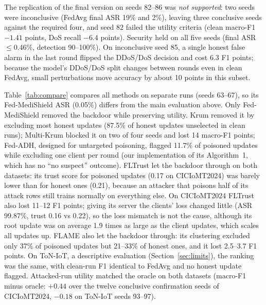 \documentclass[conference]{IEEEtran}
\begin{document}
The replication of the final version on seeds 82--86 was \emph{not supported}: two seeds were inconclusive (FedAvg final ASR 19\% and 2\%), leaving three conclusive seeds against the required four, and seed 82 failed the utility criteria (clean macro-F1 $-1.41$ points, DoS recall $-6.4$ points). Security held on all five seeds (final ASR $\leq$0.46\%, detection 90--100\%). On inconclusive seed 85, a single honest false alarm in the last round flipped the DDoS/DoS decision and cost 6.3 F1 points; because the model's DDoS/DoS split changes between rounds even in clean FedAvg, small perturbations move accuracy by about 10 points in this subset.

Table~\ref{tab:compare} compares all methods on separate runs (seeds 63--67), so its Fed-MediShield ASR (0.05\%) differs from the main evaluation above. Only Fed-MediShield removed the backdoor while preserving utility. Krum removed it by excluding most honest updates (87.5\% of honest updates unselected in clean runs); Multi-Krum blocked it on two of four seeds and lost 14 macro-F1 points; Fed-ADH, designed for untargeted poisoning, flagged 11.7\% of poisoned updates while excluding one client per round (our implementation of its Algorithm~1, which has no ``no suspect'' outcome). FLTrust let the backdoor through on both datasets: its trust score for poisoned updates (0.17 on CICIoMT2024) was barely lower than for honest ones (0.21), because an attacker that poisons half of its attack rows still trains normally on everything else. On CICIoMT2024 FLTrust also lost 11--12 F1 points; giving its server the clients' loss changed little (ASR 99.87\%, trust 0.16 vs 0.22), so the loss mismatch is not the cause, although its root update was on average 1.9 times as large as the client updates, which scales all updates up. FLAME also let the backdoor through: its clustering excluded only 37\% of poisoned updates but 21--33\% of honest ones, and it lost 2.5--3.7 F1 points. On ToN-IoT, a descriptive evaluation (Section~\ref{sec:limits}), the ranking was the same, with clean-run F1 identical to FedAvg and no honest update flagged. Attacked-run utility matched the oracle on both datasets (macro-F1 minus oracle: $+0.44$ over the twelve conclusive confirmation seeds of CICIoMT2024, $-0.18$ on ToN-IoT seeds 93--97).
\end{document}
